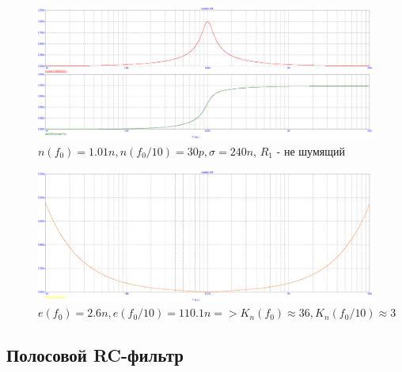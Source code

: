 \documentclass[a4paper, 12pt]{article}%
\begin{document}
\begin{enumerate}
\begin{figure}[h!]
    \centering
    \includegraphics[scale=0.3]{images/mod4_1_2_3.png}
    \caption{$n(f_0) = 1.01n, n(f_0/10) = 30p, \sigma = 240n$, $R_1$ - не шумящий}
    \label{fig:m4122}
\end{figure}

\begin{figure}[h!]
    \centering
    \includegraphics[scale=0.3]{images/mod4_1_3.png}
    \caption{$e(f_0) = 2.6n, e(f_0/10) = 110.1n => K_n(f_0) \approx 36, K_n(f_0/10) \approx 3$}
    \label{fig:m413}
\end{figure}
\FloatBarrier


\end{enumerate}

\subsection*{Полосовой RC-фильтр}
\end{document}

